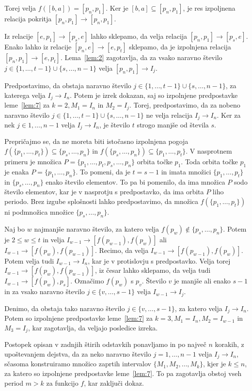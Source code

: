 \documentclass[../TG_magistrsko_delo_sections.tex]{subfiles}
\begin{document}
\begin{dokaz}
Torej velja $f([b, a]) = [p_n, p_1]$. Ker je $[b, a] \subseteq [p_n, p_1]$, je res izpoljnena relacija pokritja $[p_n, p_1] \to [p_n, p_1]$.

Iz relacije $[e, p_1] \to [p_s, e]$ lahko sklepamo, da velja relacija $[p_n, p_1] \to [p_s, e]$. Enako lahko iz relacije $[p_n, e] \to [e, p_t]$ sklepamo, da je izpolnjena relacija $[p_n, p_1] \to [e, p_t]$. Lema~\ref{lem:2} zagotavlja, da za vsako naravno število $j \in \{1, \dots, t-1\} \cup \{s, \dots, n-1\}$ velja $[p_n, p_1] \to I_j$.

Predpostavimo, da obstaja naravno število $j \in \{1, \dots, t-1\} \cup \{s, \dots, n-1\}$, za katerega velja $I_j \to I_n$. Potem je izrek dokazan, saj so izpolnjene predpostavke leme~\ref{lem:7} za $k=2, M_1 = I_n$ in $M_2=I_j$. Torej, predpostavimo, da za nobeno naravno število $j \in \{1, \dots, t-1\} \cup \{s, \dots, n-1\}$ ne velja relacija $I_j \to I_n$. Ker za nek $j \in {1, \dots, n-1}$ velja $I_j \to I_n$, je število $t$ strogo manjše od števila $s$.

Prepričajmo se, da ne moreta biti istočasno izpolnjena pogoja $f(\{p_1, \dots, p_t\}) \subseteq \{p_s, \dots, p_n\}$ in $f(\{p_s, \dots, p_n\}) \subseteq \{p_1, \dots, p_t\}$. V nasprotnem primeru je množica $P = \{p_1, \dots, p_t, p_s, \dots, p_n\}$ orbita točke $p_1$. Toda orbita točke $p_1$ je enaka $P = \{p_1, \dots, p_n\}$. To pomeni, da je $t = s-1$ in imata množici $\{p_1, \dots, p_t\}$ in $\{p_s, \dots, p_n\}$ enako število elementov. To pa bi pomenilo, da ima množica $P$ sodo število elementov, kar je v nasprotju s predpostavko, da ima orbita $P$ liho periodo. Brez izgube splošnosti lahko predpostavimo, da množica $f(\{p_1, \dots, p_t \})$ ni podmnožica množice $\{p_s, \dots, p_n\}$.

Naj bo $w$ najmanjše naravno število, za katero velja $f(p_w) \notin \{p_s, \dots, p_n\}$. Potem je $2 \leq w \leq t$ in velja $I_{w-1} \to [f(p_{w-1}), f(p_w)]$ ali $I_{w-1} \to [f(p_w), f(p_{w-1})]$. Recimo, da velja $I_{w-1} \to [f(p_{w-1}), f(p_w)]$. Potem velja tudi $I_{w-1} \to I_n$, kar je v protislovju s predpostavko. Velja torej $I_{w-1} \to [f(p_w), f(p_{w-1})]$, iz česar lahko sklepamo, da velja tudi $I_{w-1} \to [f(p_w), p_s]$. Označimo $f(p_w)$ s $p_v$. Število $v$ je manjše ali enako $s-1$ in za vsako naravno število $j \in \{v, \dots, s-1 \}$ velja $I_{w-1} \to I_j$.

Denimo, da obstaja tako naravno število $j \in \{v, \dots, s-1 \}$, za katero velja $I_j \to I_n$. Potem so izpolnjene predpostavke leme~\ref{lem:7} za $k=3, M_1 = I_n, M_2 = I_{w-1}$ in $M_3 = I_j$, kar zagotavlja, da veljajo posledice izreka.

Postopek opisan v zadnjih štirih odstavkih ponavljamo in po največ $n$ korakih, z upoštevanjem dejstva, da za neko naravno število $j = 1, \dots, n-1$ velja $I_j \to I_n$, sčasoma konstruiramo množico zaprtih intervalov $\{M_1, M_2, \dots, M_k\}$, kjer je $k \leq n$, za katero so izpolnjene predpostavke leme~\ref{lem:7}. To pa zagotavlja obstoj vseh period $m > k$ za funkcijo $f$, kar zaključi dokaz.
\end{dokaz}
\end{document}
